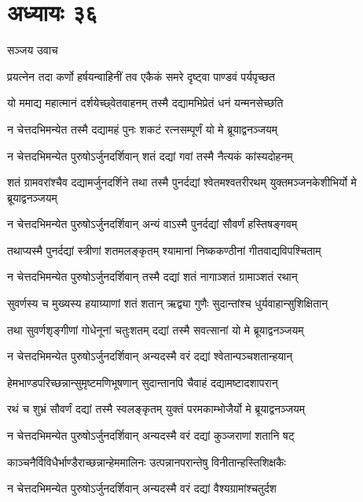 \chapter{अध्यायः ३६}
\twolineshloka
{सञ्जय उवाच}
{}


\twolineshloka
{प्रयत्नेन तदा कर्णो हर्षयन्वाहिनीं तव}
{एकैकं समरे दृष्ट्वा पाण्डवं पर्यपृच्छत}


\twolineshloka
{यो ममाद्य महात्मानं दर्शयेच्छ्वेतवाहनम्}
{तस्मै दद्यामभिप्रेतं धनं यन्मनसेच्छति}


\twolineshloka
{न चेत्तदभिमन्येत तस्मै दद्यामहं पुनः}
{शकटं रत्नसम्पूर्णं यो मे ब्रूयाद्वनञ्जयम्}


\twolineshloka
{न चेत्तदभिमन्येत पुरुषोऽर्जुनदर्शिवान्}
{शतं दद्यां गवां तस्मै नैत्यकं कांस्यदोहनम्}


\threelineshloka
{शतं ग्रामवरांश्चैव दद्यामर्जुनदर्शिने}
{तथा तस्मै पुनर्दद्यां श्वेतमश्वतरीरथम्}
{युक्तमञ्जनकेशीभिर्यो मे ब्रूयाद्वनञ्जयम्}


\twolineshloka
{न चेत्तदभिमन्येत पुरुषोऽर्जुनदर्शिवान्}
{अन्यं वाऽस्मै पुनर्दद्यां सौवर्णं हस्तिषङ्गवम्}


\twolineshloka
{तथाप्यस्मै पुनर्दद्यां स्त्रीणां शतमलङ्कृतम्}
{श्यामानां निष्ककण्ठीनां गीतवाद्यविपश्चिताम्}


\twolineshloka
{न चेत्तदभिमन्येत पुरुषोऽर्जुनदर्शिवान्}
{तस्मै दद्यां शतं नागाञ्शतं ग्रामाञ्शतं रथान्}


\twolineshloka
{सुवर्णस्य च मुख्यस्य हयाग्र्याणां शतं शतान्}
{ऋद्व्या गुणैः सुदान्तांश्च धुर्यवाहान्सुशिक्षितान्}


\twolineshloka
{तथा सुवर्णशृङ्गीणां गोधेनूनां चतुःशतम्}
{दद्यां तस्मै सवत्सानां यो मे ब्रूयाद्वनञ्जयम्}


\twolineshloka
{न चेत्तदभिमन्येत पुरुषोऽर्जुनदर्शिवान्}
{अन्यदस्मै वरं दद्यां श्वेतान्पञ्चशतान्हयान्}


\twolineshloka
{हेमभाण्डपरिच्छन्नान्सुमृष्टमणिभूषणान्}
{सुदान्तानपि चैवाहं दद्यामष्टादशापरान्}


\twolineshloka
{रथं च शुभ्रं सौवर्णं दद्यां तस्मै स्वलङ्कृतम्}
{युक्तं परमकाम्भोजैर्यो मे ब्रूयाद्वनञ्जयम्}


\twolineshloka
{न चेत्तदभिमन्येत पुरुषोऽर्जुनदर्शिवान्}
{अन्यदस्मै वरं दद्यां कुञ्जराणां शतानि षट्}


\twolineshloka
{काञ्चनैर्विविधैर्भाण्डैराच्छन्नान्हेममालिनः}
{उत्पन्नानपरान्तेषु विनीतान्हस्तिशिक्षकैः}


\twolineshloka
{न चेत्तदभिमन्येत पुरुषोऽर्जुनदर्शिवान्}
{अन्यदस्मै वरं दद्यां वैश्यग्रामांश्चतुर्दश}


